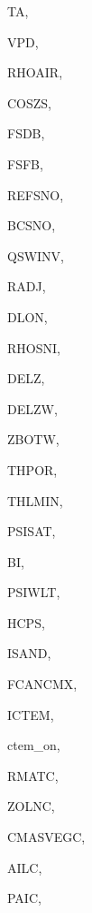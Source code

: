 {\begin{DoxyParamCaption}
\item[{real, dimension    (ilg)}]{T\+A, }
\item[{real, dimension   (ilg)}]{V\+P\+D, }
\item[{real, dimension(ilg)}]{R\+H\+O\+A\+I\+R, }
\item[{real, dimension (ilg)}]{C\+O\+S\+Z\+S, }
\item[{real, dimension(ilg,nbs)}]{F\+S\+D\+B, }
\item[{real, dimension(ilg,nbs)}]{F\+S\+F\+B, }
\item[{real, dimension(ilg)}]{R\+E\+F\+S\+N\+O, }
\item[{real, dimension(ilg)}]{B\+C\+S\+N\+O, }
\item[{real, dimension(ilg)}]{Q\+S\+W\+I\+N\+V, }
\item[{real, dimension  (ilg)}]{R\+A\+D\+J, }
\item[{real, dimension  (ilg)}]{D\+L\+O\+N, }
\item[{real, dimension(ilg)}]{R\+H\+O\+S\+N\+I, }
\item[{real, dimension  (ig)}]{D\+E\+L\+Z, }
\item[{real, dimension (ilg,ig)}]{D\+E\+L\+Z\+W, }
\item[{real, dimension (ilg,ig)}]{Z\+B\+O\+T\+W, }
\item[{real, dimension (ilg,ig)}]{T\+H\+P\+O\+R, }
\item[{real, dimension(ilg,ig)}]{T\+H\+L\+M\+I\+N, }
\item[{real, dimension(ilg,ig)}]{P\+S\+I\+S\+A\+T, }
\item[{real, dimension    (ilg,ig)}]{B\+I, }
\item[{real, dimension(ilg,ig)}]{P\+S\+I\+W\+L\+T, }
\item[{real, dimension  (ilg,ig)}]{H\+C\+P\+S, }
\item[{integer, dimension (ilg,ig)}]{I\+S\+A\+N\+D, }
\item[{real, dimension(ilg,ictem)}]{F\+C\+A\+N\+C\+M\+X, }
\item[{integer}]{I\+C\+T\+E\+M, }
\item[{logical}]{ctem\+\_\+on, }
\item[{real, dimension(ilg,ic,ig)}]{R\+M\+A\+T\+C, }
\item[{real, dimension(ilg,ic)}]{Z\+O\+L\+N\+C, }
\item[{real, dimension(ilg,ic)}]{C\+M\+A\+S\+V\+E\+G\+C, }
\item[{real, dimension  (ilg,ic)}]{A\+I\+L\+C, }
\item[{real, dimension (ilg,ic)}]{P\+A\+I\+C, }

\end{DoxyParamCaption}}
